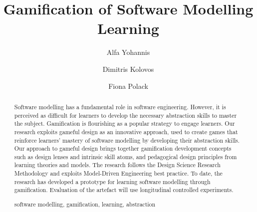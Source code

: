 \documentclass[runningheads,a4paper]{llncs}
\newcommand{\keywords}[1]{\par\addvspace\baselineskip
\noindent\keywordname\enspace\ignorespaces#1}
\begin{document}
\mainmatter  %

\title{Gamification of Software Modelling Learning}


%
%
\author{Alfa Yohannis \and Dimitris Kolovos \and Fiona Polack} %
%


%
%

\maketitle

\begin{abstract}
Software modelling has a fundamental role in software engineering. However, it is  perceived as difficult for learners to develop the necessary abstraction skills to master the subject. Gamification is  flourishing as a  popular strategy to engage learners. Our research exploits gameful design as an innovative approach, used to create games that reinforce learners' mastery of software modelling by developing their abstraction skills. Our approach to gameful design brings together gamification development concepts such as design lenses and intrinsic skill atoms, and pedagogical design principles from  learning theories and models.  The research follows the Design Science Research Methodology and exploits Model-Driven Engineering best practice.  To date, the research has developed a prototype for learning software modelling through gamification. Evaluation of the artefact will use longitudinal controlled experiments.
\keywords{software modelling, gamification, learning, abstraction}
\end{abstract}
\end{document}
